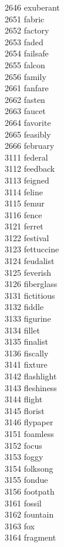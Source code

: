 2646 exuberant \\
2651 fabric \\
2652 factory \\
2653 faded \\
2654 failsafe \\
2655 falcon \\
2656 family \\
2661 fanfare \\
2662 fasten \\
2663 faucet \\
2664 favorite \\
2665 feasibly \\
2666 february \\
3111 federal \\
3112 feedback \\
3113 feigned \\
3114 feline \\
3115 femur \\
3116 fence \\
3121 ferret \\
3122 festival \\
3123 fettuccine \\
3124 feudalist \\
3125 feverish \\
3126 fiberglass \\
3131 fictitious \\
3132 fiddle \\
3133 figurine \\
3134 fillet \\
3135 finalist \\
3136 fiscally \\
3141 fixture \\
3142 flashlight \\
3143 fleshiness \\
3144 flight \\
3145 florist \\
3146 flypaper \\
3151 foamless \\
3152 focus \\
3153 foggy \\
3154 folksong \\
3155 fondue \\
3156 footpath \\
3161 fossil \\
3162 fountain \\
3163 fox \\
3164 fragment \\
